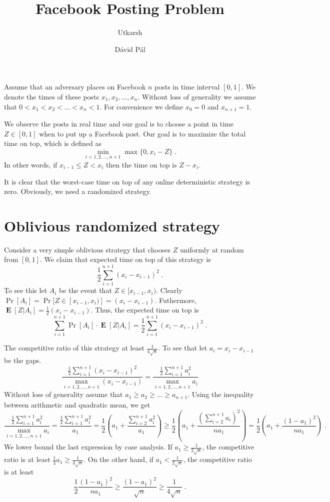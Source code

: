 \documentclass[12pt]{article}
\title{Facebook Posting Problem}
\author{Utkarsh \and D\'avid P\'al}
\DeclareMathOperator{\Exp}{\mathbf{E}}
\begin{document}
\maketitle

Assume that an adversary places on Facebook $n$ posts in time interval $[0,1]$.
We denote the times of these posts $x_1, x_2, \dots, x_n$. Without loss of
generality we assume that $0 < x_1 < x_2 < \dots < x_n < 1$. For convenience we
define $x_0 = 0$ and $x_{n+1} = 1$.

We observe the posts in real time and our goal is to choose a point in time $Z
\in [0,1]$ when to put up a Facebook post. Our goal is to maximize the total
time on top, which is defined as
$$
\min_{i=1,2,\dots,{n+1}} \max\{0, x_i - Z \}  \; .
$$
In other words, if $x_{i-1} \le Z < x_i$ then the time on top is $Z - x_i$.

It is clear that the worst-case time on top of any online deterministic strategy
is zero. Obviously, we need a randomized strategy.

\section{Oblivious randomized strategy}

Consider a very simple oblivious strategy that chooses $Z$ uniformly at random from $[0,1]$.
We claim that expected time on top of this strategy is
$$
\frac{1}{2} \sum_{i=1}^{n+1} (x_i - x_{i-1})^2 \; .
$$
To see this let $A_i$ be the event that $Z \in [x_{i-1}, x_i)$. Clearly
$\Pr[A_i] = \Pr[Z \in [x_{i-1}, x_i)] = (x_i - x_{i-1})$. Futhermore,
$\Exp[Z | A_i] = \frac{1}{2} (x_i - x_{i-1})$. Thus, the expected time on top
is
$$
\sum_{i=1}^{n+1} \Pr[A_i] \cdot \Exp[Z | A_i] = \frac{1}{2} \sum_{i=1}^{n+1} (x_i - x_{i-1})^2 \; .
$$

The competitive ratio of this strategy at least $\frac{1}{4\sqrt{n}}$. To see that let $a_i = x_i - x_{i-1}$ be the gaps.
$$
\frac{\frac{1}{2} \sum_{i=1}^{n+1} (x_i - x_{i-1})^2}{\max_{i=1,2,\dots,n+1}  (x_i - x_{i-1}) }
= \frac{\frac{1}{2} \sum_{i=1}^{n+1} a_i^2}{\max_{i=1,2,\dots,n+1} a_i}
$$
Without loss of generality assume that $a_1 \ge a_2 \ge \dots \ge a_{n+1}$. Using
the inequality between arithmetic and quadratic mean, we get
$$
\frac{\frac{1}{2} \sum_{i=1}^{n+1} a_i^2}{\max_{i=1,2,\dots,n+1} a_i}
= \frac{\frac{1}{2} \sum_{i=1}^{n+1} a_i^2}{a_1}
= \frac{1}{2} \left( a_1 + \frac{\sum_{i=2}^{n+1} a_i^2}{a_1} \right)
\ge \frac{1}{2} \left(a_1 + \frac{\left(\sum_{i=2}^{n+1} a_i \right)^2}{n a_1} \right)
= \frac{1}{2} \left(a_1 + \frac{\left(1 - a_1 \right)^2}{n a_1} \right) \; .
$$
We lower bound the last expression by case analysis. If $a_1 \ge
\frac{1}{2\sqrt{n}}$, the competitive ratio is at least $\frac{1}{2} a_1 \ge
\frac{1}{4\sqrt{n}}$. On the other hand, if $a_1 < \frac{1}{2\sqrt{n}}$, the
competitive ratio is at least
$$
\frac{1}{2} \frac{\left(1 - a_1 \right)^2}{n a_1} \ge \frac{(1 - a_1)^2}{\sqrt{n}} \ge \frac{1}{4 \sqrt{n}} \; .
$$
\end{document}
